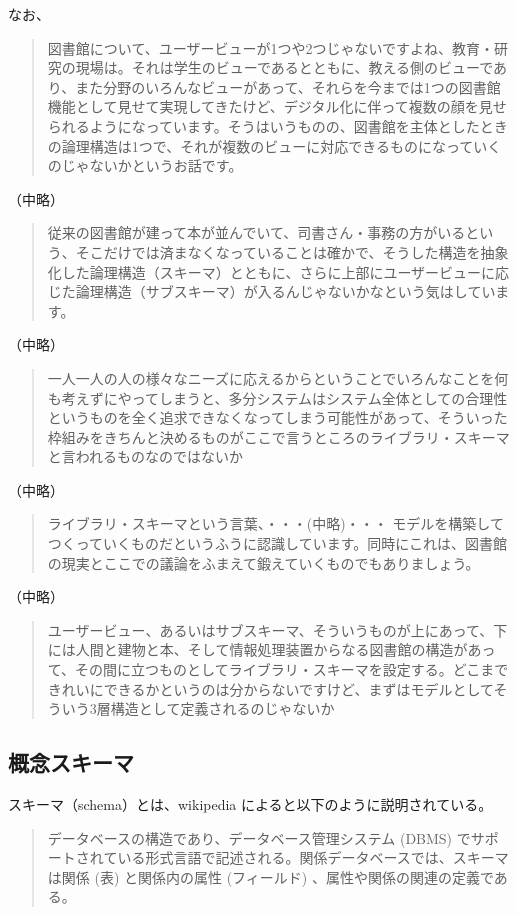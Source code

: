 \documentclass[submit,noauthor]{ono}
\begin{document}
	なお、


\begin{quote}
図書館について、ユーザービューが1つや2つじゃないですよね、教育・研究の現場は。それは学生のビューであるとともに、教える側のビューであり、また分野のいろんなビューがあって、それらを今までは1つの図書館機能として見せて実現してきたけど、デジタル化に伴って複数の顔を見せられるようになっています。そうはいうものの、図書館を主体としたときの論理構造は1つで、それが複数のビューに対応できるものになっていくのじゃないかというお話です。
\end{quote}
（中略）
\begin{quote}
従来の図書館が建って本が並んでいて、司書さん・事務の方がいるという、そこだけでは済まなくなっていることは確かで、そうした構造を抽象化した論理構造（スキーマ）とともに、さらに上部にユーザービューに応じた論理構造（サブスキーマ）が入るんじゃないかなという気はしています。
\end{quote}
（中略）
\begin{quote}
一人一人の人の様々なニーズに応えるからということでいろんなことを何も考えずにやってしまうと、多分システムはシステム全体としての合理性というものを全く追求できなくなってしまう可能性があって、そういった枠組みをきちんと決めるものがここで言うところのライブラリ・スキーマと言われるものなのではないか
\end{quote}
（中略）
\begin{quote}
ライブラリ・スキーマという言葉、・・・(中略)・・・ モデルを構築してつくっていくものだというふうに認識しています。同時にこれは、図書館の現実とここでの議論をふまえて鍛えていくものでもありましょう。
\end{quote}
（中略）
\begin{quote}
ユーザービュー、あるいはサブスキーマ、そういうものが上にあって、下には人間と建物と本、そして情報処理装置からなる図書館の構造があって、その間に立つものとしてライブラリ・スキーマを設定する。どこまできれいにできるかというのは分からないですけど、まずはモデルとしてそういう3層構造として定義されるのじゃないか
\end{quote}

	\subsection{概念スキーマ}

スキーマ（schema）とは、wikipedia によると以下のように説明されている。

	\begin{quote}
	データベースの構造であり、データベース管理システム (DBMS) でサポートされている形式言語で記述される。関係データベースでは、スキーマは関係 (表) と関係内の属性 (フィールド) 、属性や関係の関連の定義である。
	\end{quote}
	
\end{document}
